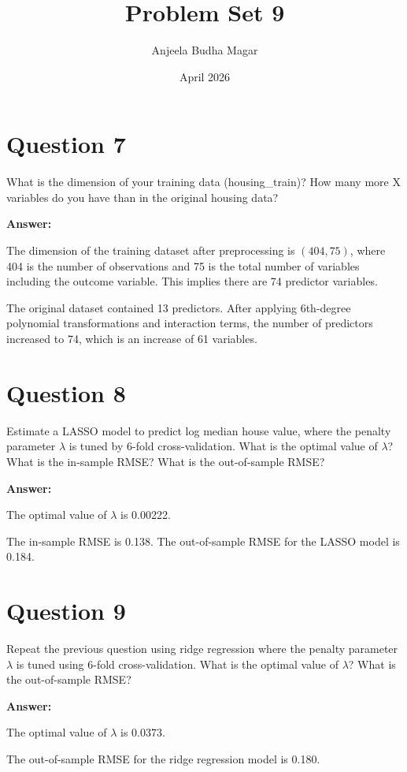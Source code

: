 \documentclass{article}
\title{Problem Set 9}
\author{Anjeela Budha Magar}
\date{April 2026}
\begin{document}
\maketitle

\section*{Question 7}

What is the dimension of your training data (housing\_train)? How many more X variables do you have than in the original housing data?

\textbf{Answer:}

The dimension of the training dataset after preprocessing is $(404, 75)$, where 404 is the number of observations and 75 is the total number of variables including the outcome variable. This implies there are 74 predictor variables.

The original dataset contained 13 predictors. After applying 6th-degree polynomial transformations and interaction terms, the number of predictors increased to 74, which is an increase of 61 variables.


\section*{Question 8}

Estimate a LASSO model to predict log median house value, where the penalty parameter $\lambda$ is tuned by 6-fold cross-validation. What is the optimal value of $\lambda$? What is the in-sample RMSE? What is the out-of-sample RMSE?

\textbf{Answer:}

The optimal value of $\lambda$ is 0.00222.

The in-sample RMSE is 0.138. The out-of-sample RMSE for the LASSO model is 0.184.

\section*{Question 9}

Repeat the previous question using ridge regression where the penalty parameter $\lambda$ is tuned using 6-fold cross-validation. What is the optimal value of $\lambda$? What is the out-of-sample RMSE?

\textbf{Answer:}

The optimal value of $\lambda$ is 0.0373.

The out-of-sample RMSE for the ridge regression model is 0.180. 
\end{document}
